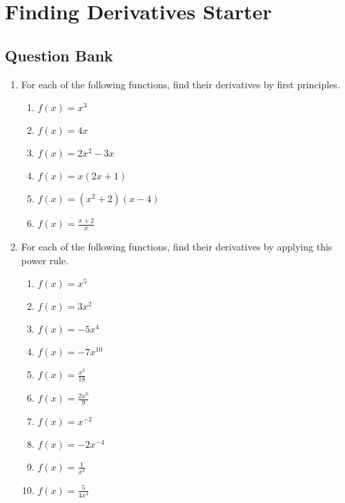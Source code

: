 \documentclass[a4paper,12pt]{article}
\begin{document}
\section*{Finding Derivatives Starter}

\subsection*{Question Bank}

\begin{enumerate}
\item For each of the following functions, find their derivatives by first 
principles. %
\begin{multicols}{2}
    \begin{enumerate}
    \item \sspacer$f(x) = x^3$
    \item \sspacer$f(x) = 4x$
    \item \sspacer$f(x) = 2x^2 - 3x$
    \item \sspacer$f(x) = x(2x + 1)$
    \item \sspacer$f(x) = (x^2 + 2)(x - 4)$
    \item \sspacer$f(x) = \frac{x + 2}{x}$
    \end{enumerate}
    \end{multicols}

\item For each of the following functions, find their derivatives by applying 
this power rule.
    \begin{multicols}{2}
    \begin{enumerate}
    \item \spacer$f(x) = x^5$
    \item \spacer$f(x) = 3x^2$
    \item \spacer$f(x) = -5x^4$
    \item \spacer$f(x) = -7x^{10}$
    \item \spacer$f(x) = \frac{x^3}{18}$
    \item \spacer$f(x) = \frac{2x^6}{9}$
    \item \spacer$f(x) = x^{-2}$
    \item \spacer$f(x) = -2x^{-4}$
    \item \spacer$f(x) = \frac{1}{x^3}$
    \item \spacer$f(x) = \frac{5}{4x^4}$
    \end{enumerate}
    \end{multicols}


\end{enumerate}
\end{document}
